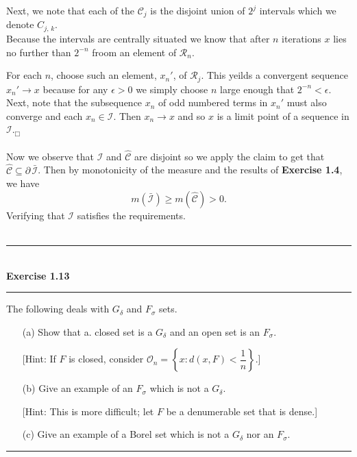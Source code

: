 \documentclass[a4paper,11pt]{article}
\begin{document}
Next, we note that each of the $\mathcal{C}_j$ is the disjoint union of $2^j$ intervals which we denote $C_{j,\,k}$.\\

Because the intervals are centrally situated we know that after $n$ iterations $x$ lies no further than $2^{-n}$ froom an element of $\mathcal{R}_n$.

For each $n$, choose such an element, $x_n'$, of $\mathcal{R}_j$. This yeilds a convergent sequence $x_n' \to x$ because for any $\epsilon > 0$ we simply choose $n$ large enough that $2^{-n} < \epsilon$.\\

Next, note that the subsequence $x_n$ of odd numbered terms in $x_n'$ must also converge and each $x_n \in \mathcal{I}$. Then $x_n \to x$ and so $x$ is a limit point of a sequence in $\mathcal{I}$.\;$_\Box$\\\\

Now we observe that $\mathcal{I}$ and $\hat{\mathcal{C}}$ are disjoint so we apply the claim to get that $\hat{\mathcal{C}} \subseteq \partial\,\bar{\mathcal{I}}$. Then by monotonicity of the measure and the results of \textbf{Exercise 1.4}, we have
	$$m(\bar{\mathcal{I}}) \geq m(\hat{\mathcal{C}}) > 0.$$
Verifying that $\mathcal{I}$ satisfies the requirements.\\\\




\begin{flushleft}
	\rule[-0.5ex]{17cm}{2pt}\\
		\textbf{Exercise 1.13}\\
	\rule[1.5ex]{17cm}{0.5pt}
		The following deals with $G_\delta$ and $F_\sigma$ sets.
		\begin{enumerate}
			\item [(a)] Show that a. closed set is a $G_\delta$ and an open set is an $F_\sigma$.

			[Hint: If $F$ is closed, consider $\mathcal{O}_n = \left\{x:d(x,F) < \dfrac{1}{n} \right\}$.]

			\item [(b)] Give an example of an $F_\sigma$ which is not a $G_\delta$.

			[Hint: This is more difficult; let $F$ be a denumerable set that is dense.]

			\item [(c)] Give an example of a Borel set which is not a $G_\delta$ nor an $F_\sigma$.
		\end{enumerate}
	\rule[1.0ex]{17cm}{0.5pt}\
\end{flushleft}
\end{document}
